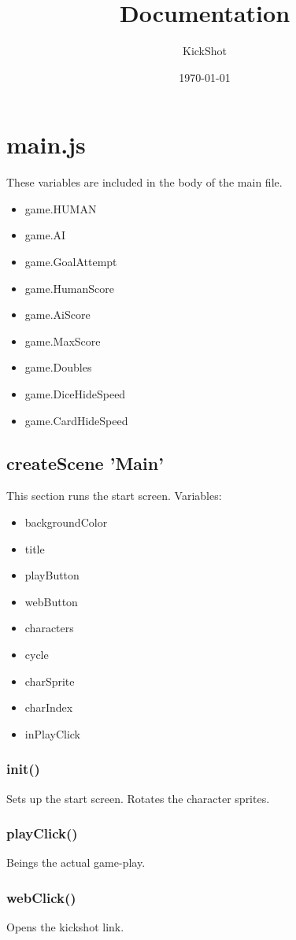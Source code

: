 \documentclass[12pt]{article}
\title{Documentation}
\subtitle{KickShot}
\date{\today}
\begin{document}
\maketitle

\section*{main.js}
These variables are included in the body of the main file.
\begin{itemize}
\item game.HUMAN
\item game.AI
\item game.GoalAttempt
\item game.HumanScore
\item game.AiScore
\item game.MaxScore
\item game.Doubles 
\item game.DiceHideSpeed
\item game.CardHideSpeed
\end{itemize}
\subsection*{createScene 'Main'}
This section runs the start screen. 
Variables: 
\begin{itemize}
\item backgroundColor
\item title 
\item playButton
\item webButton
\item characters
\item cycle
\item charSprite 
\item charIndex 
\item inPlayClick 
\end{itemize}
\subsubsection*{init()}
Sets up the start screen. Rotates the character sprites. 
\subsubsection*{playClick()}
Beings the actual game-play.
\subsubsection*{webClick()}
Opens the kickshot link. 
\end{document}
